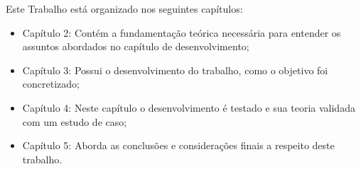 Este Trabalho está organizado nos seguintes capítulos:

\begin{itemize}
	\item Capítulo 2: Contém a fundamentação teórica necessária para entender os assuntos abordados no capítulo de desenvolvimento;
	\item Capítulo 3: Possui o desenvolvimento do trabalho, como o objetivo foi concretizado;
	\item Capítulo 4: Neste capítulo o desenvolvimento é testado e sua teoria validada com um estudo de caso;
	\item Capítulo 5: Aborda as conclusões e considerações finais a respeito deste trabalho.
\end{itemize}